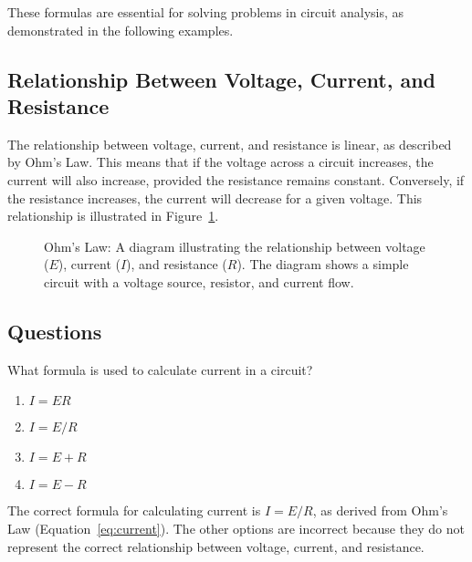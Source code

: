 These formulas are essential for solving problems in circuit analysis, as demonstrated in the following examples.

\subsection*{Relationship Between Voltage, Current, and Resistance}
The relationship between voltage, current, and resistance is linear, as described by Ohm's Law. This means that if the voltage across a circuit increases, the current will also increase, provided the resistance remains constant. Conversely, if the resistance increases, the current will decrease for a given voltage. This relationship is illustrated in Figure~\ref{fig:ohms_law}.

\begin{figure}[h]
    \centering
    \caption{Ohm's Law: A diagram illustrating the relationship between voltage (\(E\)), current (\(I\)), and resistance (\(R\)). The diagram shows a simple circuit with a voltage source, resistor, and current flow.}
    \label{fig:ohms_law}
\end{figure}

\subsection*{Questions}
\begin{tcolorbox}[colback=gray!10!white,colframe=black!75!black,title={T5D01}]
    What formula is used to calculate current in a circuit?
    \begin{enumerate}[label=\Alph*,noitemsep]
        \item \(I = E R\)
        \item \textbf{\(I = E / R\)}
        \item \(I = E + R\)
        \item \(I = E - R\)
    \end{enumerate}
\end{tcolorbox}
The correct formula for calculating current is \(I = E / R\), as derived from Ohm's Law (Equation~\ref{eq:current}). The other options are incorrect because they do not represent the correct relationship between voltage, current, and resistance.

